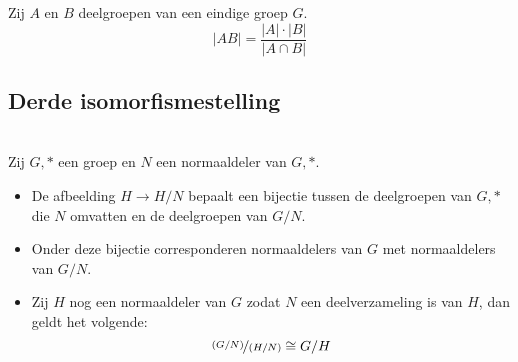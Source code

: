 \documentclass[main.tex]{subfiles}
\begin{document}
\begin{st}
  Zij $A$ en $B$ deelgroepen van een eindige groep $G$.
  \[ |AB| = \frac{|A|\cdot|B|}{|A\cap B|} \]
  \zb
\end{st}

\subsection{Derde isomorfismestelling}

\begin{st}
  \\
  Zij $G,*$ een groep en $N$ een normaaldeler van $G,*$.
  \begin{itemize}
  \item De afbeelding $H \rightarrow H/N$ bepaalt een bijectie tussen de deelgroepen van $G,*$ die $N$ omvatten en de deelgroepen van $G/N$.
  \item Onder deze bijectie corresponderen normaaldelers van $G$ met normaaldelers van $G/N$.
  \item Zij $H$ nog een normaaldeler van $G$ zodat $N$ een deelverzameling is van $H$, dan geldt het volgende:
    \[ \nicefrac{(G/N)}{(H/N)} \cong G/H\]
  \end{itemize}


\end{st}
\end{document}
